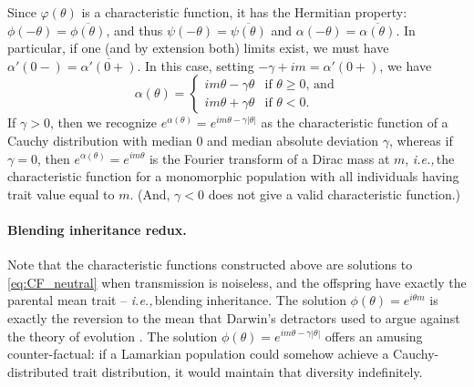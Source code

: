 \documentclass{article}
\newcommand{\E}{\mathbb{E}}
\newcommand{\ie}{\textit{i.e.,}\,}
\newcommand{\1}{\mathbbm{1}}
\DeclareMathOperator*{\re}{Re}
\theoremstyle{remark}
\theoremstyle{definition}
\begin{document}
Since $\varphi(\theta)$ is a characteristic function, it has the Hermitian property: $\phi(-\theta) = \overline{\phi(\theta)}$, and thus $\psi(-\theta) = \overline{\psi(\theta)}$ and $\alpha(-\theta) = \overline{\alpha(\theta)}$.  In particular, if one (and by extension both) limits exist, we must have $\alpha'(0-) = \overline{\alpha'(0+)}$.  In this case, setting $-\gamma + i m = \alpha'(0+)$, we have
\[
	\alpha(\theta) = \begin{cases} 
		i m\theta - \gamma \theta & \text{if $\theta \geq 0$, and}\\
		i m\theta + \gamma \theta & \text{if $\theta < 0$}.
	\end{cases}
\]
If $\gamma > 0$, then we recognize $e^{\alpha(\theta)} = e^{im \theta -\gamma|\theta|}$ as the characteristic function of a Cauchy distribution with median 0 and median absolute deviation $\gamma$, whereas if $\gamma = 0$, then $e^{\alpha(\theta)} = e^{im \theta}$ is the Fourier transform of a Dirac mass at $m$, \ie the characteristic function for a monomorphic population with all individuals having trait value equal to $m$.
(And, $\gamma < 0$ does not give a valid characteristic function.)

\paragraph{Blending inheritance redux.} 
Note that the characteristic functions constructed above are solutions to \eqref{eq:CF_neutral} when transmission is noiseless, and the offspring have exactly the parental mean trait -- \ie blending inheritance.  The solution $\phi(\theta) = e^{i\theta m}$ is exactly the reversion to the mean that Darwin's detractors used to argue against the theory of evolution \citep{jenkin1867,Provine1971}.  The solution $\phi(\theta) = e^{im \theta -\gamma|\theta|}$ offers an amusing counter-factual: if a Lamarkian population could somehow achieve a Cauchy-distributed trait distribution, it would maintain that diversity indefinitely.  
\end{document}
